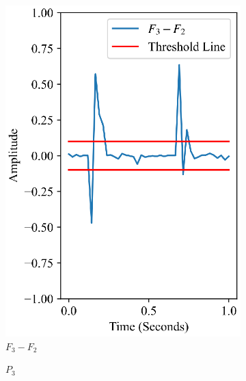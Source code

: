 \begin{figure}[ht]
\begin{subfigure}{0.24\textwidth}
        \includegraphics[width=\linewidth]{Figures/chap4/proposed/f3-f2.eps}        
        \caption{$F_3 - F_2$}
        \label{fig:f3-f2}
    \end{subfigure}
    \begin{subfigure}{0.24\textwidth}
        
        \caption{$P_3$}
        \label{fig:pframe3}
    \end{subfigure}
    \begin{subfigure}{0.24\textwidth}

\end{subfigure}
\end{figure}
